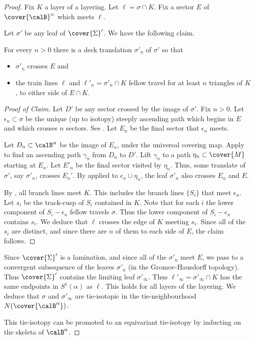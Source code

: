 \documentclass[12pt]{amsart}
\begin{document}
\begin{proof}
Fix $K$ a layer of a layering.
Let $\ell = \sigma \cap K$. Fix a sector $E$ of $\cover{\calB}^\alpha$ which meets $\ell$. 
 
Let $\sigma'$ be any leaf of $\cover{\Sigma}'$. 
We have the following claim.
\begin{claim*}
For every $n > 0$ there is a deck translation $\sigma'_n$ of $\sigma'$ so that 
\begin{itemize}
\item
$\sigma'_n$ crosses $E$ and
\item
the train lines $\ell$ and $\ell'_n = \sigma'_n \cap K$ fellow travel for at least $n$ triangles of $K$, to either side of $E \cap K$. 
\end{itemize}
\end{claim*}

\begin{proof}[Proof of Claim]
Let $D'$ be any sector crossed by the image of $\sigma'$. Fix $n > 0$.  Let $\epsilon_n \subset \sigma$ be the unique (up to isotopy) steeply ascending path which begins in $E$ and which crosses $n$ sectors.  See .  Let $E_n$ be the final sector that $\epsilon_n$ meets.  

Let $D_n \subset \calB^\alpha$ be the image of $E_n$, under the universal covering map.  Apply  to find an ascending path $\gamma_n$ from $D_n$ to $D'$.  Lift $\gamma_n$ to a path $\eta_n \subset \cover{M}$ starting at $E_n$.  Let $E'_n$ be the final sector visited by $\eta_n$.  Thus, some translate of $\sigma'$, say $\sigma'_n$, crosses $E_n'$. By  applied to $\epsilon_n \cup \eta_n$, the leaf $\sigma'_n$ also crosses $E_n$ and $E$. 

By , all branch lines meet $K$.  This includes the branch lines $\{S_i\}$ that meet $\epsilon_n$. Let $s_i$ be the track-cusp of $S_i$ contained in $K$.  Note that for each $i$ the lower component of $S_i - \epsilon_n$ fellow travels $\sigma$. Thus the lower component of $S_i - \epsilon_n$ contains $s_i$. We deduce that $\ell$ crosses the edge of $K$ meeting $s_i$. Since all of the $s_i$ are distinct, and since there are $n$ of them to each side of $E$, the claim follows.
\end{proof}

Since $\cover{\Sigma}'$ is a lamination, and since all of the $\sigma'_n$ meet $E$, we pass to a convergent subsequence of the leaves $\sigma'_n$ (in the Gromov-Hausdorff topology).  
Thus $\cover{\Sigma}'$ contains the limiting leaf $\sigma'_\infty$.  Thus $\ell'_\infty = \sigma'_\infty \cap K$ has the same endpoints in $S^1(\alpha)$ as $\ell$. This holds for all layers of the layering. We deduce that $\sigma$ and $\sigma'_\infty$ are tie-isotopic in the tie-neighbourhood $N(\cover{\calB^\alpha})$.

This tie-isotopy can be promoted to an equivariant tie-isotopy by inducting on the skeleta of $\calB^\alpha$.
\end{proof}
\end{document}

